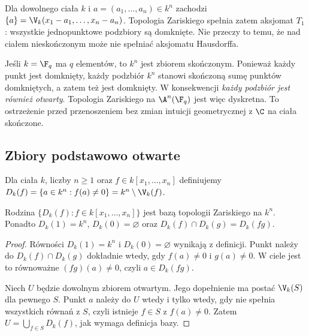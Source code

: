 \begin{przyklad}
Dla dowolnego ciała $k$ i $a=(a_1,\dots,a_n)\in k^n$
zachodzi $\{a\}=\V_k(x_1-a_1,\dots,x_n-a_n)$.
Topologia Zariskiego spełnia zatem aksjomat $T_1$: wszystkie
jednopunktowe podzbiory są domknięte. Nie przeczy to temu, że
nad ciałem nieskończonym może nie spełniać aksjomatu Hausdorffa.
\end{przyklad}

\begin{przyklad}
Jeśli $k=\F_q$ ma $q$ elementów, to $k^n$ jest zbiorem skończonym.
Ponieważ każdy punkt jest domknięty, każdy podzbiór $k^n$
stanowi skończoną sumę punktów domkniętych, a zatem też jest domknięty.
W konsekwencji \emph{każdy podzbiór jest również otwarty}.
Topologia Zariskiego na $\A^n(\F_q)$ jest więc dyskretna.
To ostrzeżenie przed przenoszeniem bez zmian intuicji geometrycznej
z $\C$ na ciała skończone.
\end{przyklad}

\subsection{Zbiory podstawowo otwarte}

\begin{definicja}
Dla ciała $k$, liczby $n\ge1$ oraz $f\in k[x_1,\dots,x_n]$
definiujemy $D_k(f)=\{a\in k^n:f(a)\ne0\}=k^n\setminus\V_k(f)$.
\end{definicja}

\begin{stwierdzenie}
Rodzina $\{D_k(f):f\in k[x_1,\dots,x_n]\}$ jest bazą topologii
Zariskiego na $k^n$. Ponadto $D_k(1)=k^n$, $D_k(0)=\varnothing$
oraz $D_k(f)\cap D_k(g)=D_k(fg)$.
\end{stwierdzenie}
\begin{proof}
Równości $D_k(1)=k^n$ i $D_k(0)=\varnothing$ wynikają z definicji.
Punkt należy do $D_k(f)\cap D_k(g)$ dokładnie wtedy,
gdy $f(a)\ne0$ i $g(a)\ne0$. W ciele jest to równoważne
$(fg)(a)\ne0$, czyli $a\in D_k(fg)$.

Niech $U$ będzie dowolnym zbiorem otwartym.
Jego dopełnienie ma postać $\V_k(S)$ dla pewnego $S$.
Punkt $a$ należy do $U$ wtedy i tylko wtedy, gdy nie spełnia
wszystkich równań z $S$, czyli istnieje $f\in S$ z $f(a)\ne0$.
Zatem $U=\bigcup_{f\in S}D_k(f)$, jak wymaga definicja bazy.
\end{proof}

